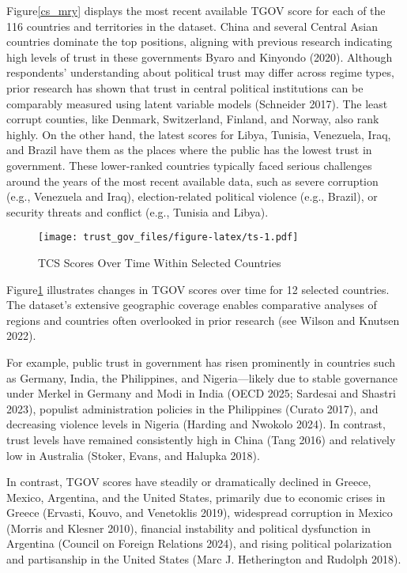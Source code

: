 \documentclass[
  12pt,
]{article}
\begin{document}
Figure\nobreakspace{}\ref{cs_mry} displays the most recent available TGOV score for each of the 116 countries and territories in the dataset.
China and several Central Asian countries dominate the top positions, aligning with previous research indicating high levels of trust in these governments Byaro and Kinyondo (2020).
Although respondents' understanding about political trust may differ across regime types, prior research has shown that trust in central political institutions can be comparably measured using latent variable models (Schneider 2017).
The least corrupt counties, like Denmark, Switzerland, Finland, and Norway, also rank highly.
On the other hand, the latest scores for Libya, Tunisia, Venezuela, Iraq, and Brazil have them as the places where the public has the lowest trust in government.
These lower-ranked countries typically faced serious challenges around the years of the most recent available data, such as severe corruption (e.g., Venezuela and Iraq), election-related political violence (e.g., Brazil), or security threats and conflict (e.g., Tunisia and Libya).

\begin{figure}
\centering
\texttt{[image: trust\_gov\_files/figure-latex/ts-1.pdf]}
\caption{\label{fig:ts}TCS Scores Over Time Within Selected Countries \label{ts_plots}}
\end{figure}

Figure\nobreakspace{}\ref{ts_plots} illustrates changes in TGOV scores over time for 12 selected countries.
The dataset's extensive geographic coverage enables comparative analyses of regions and countries often overlooked in prior research (see Wilson and Knutsen 2022).

For example, public trust in government has risen prominently in countries such as Germany, India, the Philippines, and Nigeria---likely due to stable governance under Merkel in Germany and Modi in India (OECD 2025; Sardesai and Shastri 2023), populist administration policies in the Philippines (Curato 2017), and decreasing violence levels in Nigeria (Harding and Nwokolo 2024).
In contrast, trust levels have remained consistently high in China (Tang 2016) and relatively low in Australia (Stoker, Evans, and Halupka 2018).

In contrast, TGOV scores have steadily or dramatically declined in Greece, Mexico, Argentina, and the United States, primarily due to economic crises in Greece (Ervasti, Kouvo, and Venetoklis 2019), widespread corruption in Mexico (Morris and Klesner 2010), financial instability and political dysfunction in Argentina (Council on Foreign Relations 2024), and rising political polarization and partisanship in the United States (Marc J. Hetherington and Rudolph 2018).
\end{document}
